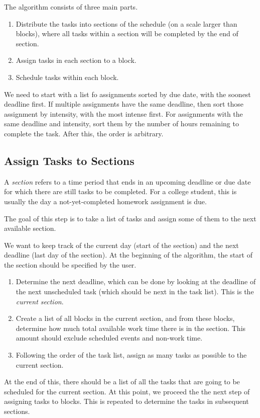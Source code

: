 \documentclass{article}
\begin{document}
	The algorithm consists of three main parts.
	\begin{enumerate}
		\item Distribute the tasks into sections of the schedule (on a scale larger than blocks), where all tasks within a section will be completed by the end of section.
		\item Assign tasks in each section to a block. 
		\item Schedule tasks within each block.
	\end{enumerate}
	
	We need to start with a list fo assignments sorted by due date, with the soonest deadline first.
	If multiple assignments have the same deadline, then sort those assignment by intensity, with the most intense first.
	For assignments with the same deadline and intensity, sort them by the number of hours remaining to complete the task.
	After this, the order is arbitrary.

	\subsection{Assign Tasks to Sections}
		A \textit{section} refers to a time period that ends in an upcoming deadline or due date for which there are still tasks to be completed.
		For a college student, this is usually the day a not-yet-completed homework assignment is due.
		
		The goal of this step is to take a list of tasks and assign some of them to the next available section.
		
		We want to keep track of the current day (start of the section) and the next deadline (last day of the section).
		At the beginning of the algorithm, the start of the section should be specified by the user.
		\begin{enumerate}
			\item 
				Determine the next deadline, which can be done by looking at the deadline of the next unscheduled task (which should be next in the task list). This is the \emph{current section}.
			\item 
				Create a list of all blocks in the current section, and from these blocks, determine how much total available work time there is in the section.
				This amount should exclude scheduled events and non-work time.
			\item
				Following the order of the task list, assign as many tasks as possible to the current section.
		\end{enumerate}
		At the end of this, there should be a list of all the tasks that are going to be scheduled for the current section.
		At this point, we proceed the the next step of assigning tasks to blocks.
		This is repeated to determine the tasks in subsequent sections.
		
\end{document}
